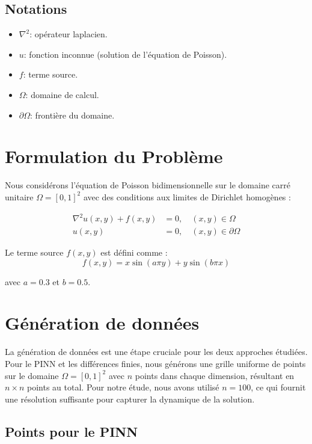 \documentclass[11pt,a4paper]{article}
\begin{document}
\subsection*{Notations}
\begin{itemize}
    \item $\nabla^2$: opérateur laplacien.
    \item $u$: fonction inconnue (solution de l'équation de Poisson).
    \item $f$: terme source.
    \item $\Omega$: domaine de calcul.
    \item $\partial\Omega$: frontière du domaine.
\end{itemize}

\section{Formulation du Problème}

Nous considérons l'équation de Poisson bidimensionnelle sur le domaine carré unitaire $\Omega = [0,1]^2$ avec des conditions aux limites de Dirichlet homogènes :

\begin{align}
\nabla^2 u(x,y) + f(x,y) &= 0, \quad (x,y) \in \Omega \\
u(x,y) &= 0, \quad (x,y) \in \partial\Omega
\end{align}

Le terme source $f(x,y)$ est défini comme :
\begin{equation}
f(x,y) = x\sin(a\pi y) + y\sin(b\pi x)
\end{equation}

avec $a = 0.3$ et $b = 0.5$.

\section{Génération de données}

La génération de données est une étape cruciale pour les deux approches étudiées. Pour le PINN et les différences finies, nous générons une grille uniforme de points sur le domaine $\Omega = [0,1]^2$ avec $n$ points dans chaque dimension, résultant en $n \times n$ points au total. Pour notre étude, nous avons utilisé $n = 100$, ce qui fournit une résolution suffisante pour capturer la dynamique de la solution.

\subsection{Points pour le PINN}
\end{document}
